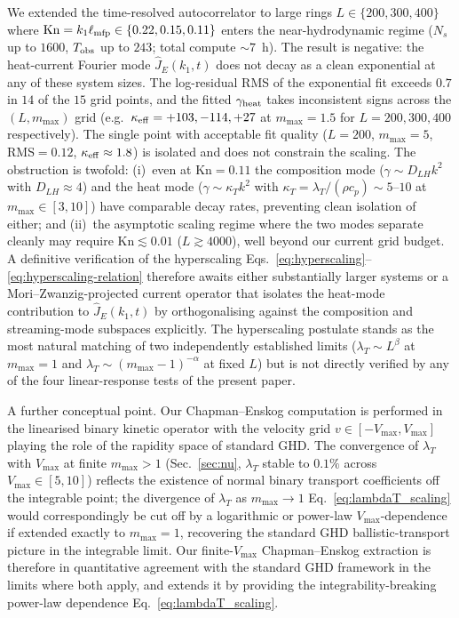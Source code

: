 \documentclass[aps,pre,twocolumn,superscriptaddress,longbibliography,floatfix]{revtex4-2}
\begin{document}
We extended the time-resolved autocorrelator to large rings
$L\in\{200, 300, 400\}$ where
$\mathrm{Kn}=k_1\ell_{\rm mfp}\in\{0.22, 0.15, 0.11\}$
enters the near-hydrodynamic regime ($N_s$ up to $1600$,
$T_{\rm obs}$ up to $243$; total compute $\sim 7$~h). The
result is negative: the heat-current Fourier mode
$\hat J_E(k_1, t)$ does not decay as a clean exponential
at any of these system sizes. The log-residual RMS of the
exponential fit exceeds $0.7$ in $14$ of the $15$ grid
points, and the fitted $\gamma_{\rm heat}$ takes
inconsistent signs across the $(L, m_{\max})$ grid
(e.g.\ $\kappa_{\rm eff}=+103, -114, +27$ at
$m_{\max}=1.5$ for $L=200, 300, 400$ respectively). The
single point with acceptable fit quality
($L=200$, $m_{\max}=5$, RMS$=0.12$,
$\kappa_{\rm eff}\approx 1.8$) is isolated and does not
constrain the scaling. The obstruction is twofold:
(i)~even at $\mathrm{Kn}=0.11$ the composition mode
($\gamma\sim D_{LH}k^2$ with $D_{LH}\approx 4$) and
the heat mode
($\gamma\sim\kappa_T k^2$ with
$\kappa_T=\lambda_T/(\rho c_p)\sim 5$--$10$ at
$m_{\max}\in[3,10]$) have comparable decay rates,
preventing clean isolation of either; and (ii)~the
asymptotic scaling regime where the two modes separate
cleanly may require $\mathrm{Kn}\lesssim 0.01$
($L\gtrsim 4000$), well beyond our current grid budget.
A definitive verification of the hyperscaling
Eqs.~\eqref{eq:hyperscaling}--\eqref{eq:hyperscaling-relation}
therefore awaits either substantially larger systems or a
Mori--Zwanzig-projected current operator that isolates the
heat-mode contribution to $\hat J_E(k_1, t)$ by
orthogonalising against the composition and streaming-mode
subspaces explicitly. The hyperscaling postulate stands as
the most natural matching of two independently established
limits ($\lambda_T\sim L^\beta$ at $m_{\max}=1$ and
$\lambda_T\sim(m_{\max}-1)^{-\alpha}$ at fixed $L$) but
is not directly verified by any of the four
linear-response tests of the present paper.

A further conceptual point. Our Chapman--Enskog
computation is performed in the linearised binary kinetic
operator with the velocity grid $v\in[-V_{\max},V_{\max}]$
playing the role of the rapidity space of standard GHD.
The convergence of $\lambda_T$ with $V_{\max}$ at finite
$m_{\max}>1$ (Sec.~\ref{sec:nu}, $\lambda_T$ stable to
$0.1\%$ across $V_{\max}\in[5,10]$) reflects the
existence of normal binary transport coefficients off the
integrable point; the divergence of $\lambda_T$ as
$m_{\max}\to 1$ Eq.~\eqref{eq:lambdaT_scaling} would
correspondingly be cut off by a logarithmic or power-law
$V_{\max}$-dependence if extended exactly to $m_{\max}=1$,
recovering the standard GHD ballistic-transport picture in
the integrable limit. Our finite-$V_{\max}$ Chapman--Enskog
extraction is therefore in quantitative agreement with the
standard GHD framework in the limits where both apply, and
extends it by providing the integrability-breaking
power-law dependence Eq.~\eqref{eq:lambdaT_scaling}.
\end{document}
